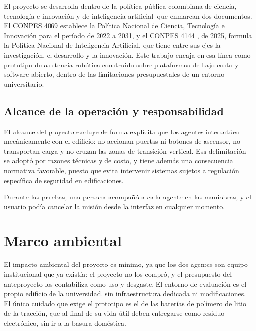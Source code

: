El proyecto se desarrolla dentro de la política pública colombiana de ciencia, tecnología e innovación y de
inteligencia artificial, que enmarcan dos documentos. El CONPES 4069 \autocite{conpes4069} establece la Política
Nacional de Ciencia, Tecnología e Innovación para el período de 2022 a 2031, y el CONPES 4144
\autocite{conpes4144}, de 2025, formula la Política Nacional de Inteligencia Artificial, que tiene entre sus ejes
la investigación, el desarrollo y la innovación. Este trabajo encaja en esa línea como prototipo de asistencia robótica
construido sobre plataformas de bajo costo y software abierto, dentro de las limitaciones presupuestales de un
entorno universitario.



\subsection{Alcance de la operación y responsabilidad}

El alcance del proyecto excluye de forma explícita que los agentes interactúen mecánicamente con el edificio: no
accionan puertas ni botones de ascensor, no transportan carga y no cruzan las zonas de transición vertical. Esa
delimitación se adoptó por razones técnicas y de costo, y tiene además una consecuencia normativa favorable, puesto
que evita intervenir sistemas sujetos a regulación específica de seguridad en edificaciones.

Durante las pruebas, una persona acompañó a cada agente en las maniobras, y el usuario podía cancelar la misión desde la interfaz en cualquier momento.



\section{Marco ambiental}
\label{sec:ambiental}

El impacto ambiental del proyecto es mínimo, ya que los dos agentes son equipo institucional que ya existía: el
proyecto no los compró, y el presupuesto del anteproyecto los contabiliza como uso y desgaste. El entorno de evaluación
es el propio edificio de la universidad, sin infraestructura dedicada ni modificaciones. El único cuidado que exige el
prototipo es el de las baterías de polímero de litio de la tracción, que al final de su vida útil deben entregarse como
residuo electrónico, sin ir a la basura doméstica.
